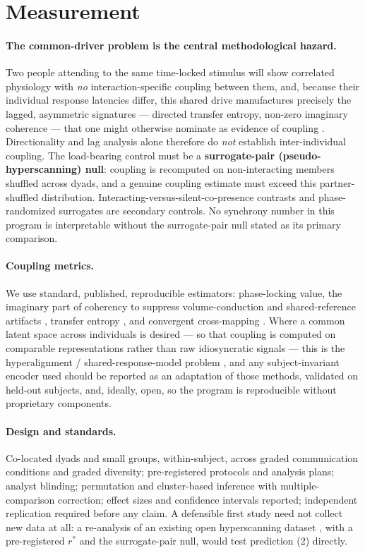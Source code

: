 \documentclass[11pt]{article}
\begin{document}
\section{Measurement}
\label{sec:measure}

\paragraph{The common-driver problem is the central methodological hazard.} Two people attending to the same time-locked stimulus will show correlated physiology with \emph{no} interaction-specific coupling between them, and, because their individual response latencies differ, this shared drive manufactures precisely the lagged, asymmetric signatures --- directed transfer entropy, non-zero imaginary coherence --- that one might otherwise nominate as evidence of coupling \citep{burgess2013conceptual, novembre2021hyperscanning, hamilton2021hyperscanning}. Directionality and lag analysis alone therefore do \emph{not} establish inter-individual coupling. The load-bearing control must be a \textbf{surrogate-pair (pseudo-hyperscanning) null}: coupling is recomputed on non-interacting members shuffled across dyads, and a genuine coupling estimate must exceed this partner-shuffled distribution. Interacting-versus-silent-co-presence contrasts and phase-randomized surrogates are secondary controls. No synchrony number in this program is interpretable without the surrogate-pair null stated as its primary comparison.

\paragraph{Coupling metrics.} We use standard, published, reproducible estimators: phase-locking value, the imaginary part of coherency to suppress volume-conduction and shared-reference artifacts \citep{nolte2004identifying}, transfer entropy \citep{schreiber2000measuring}, and convergent cross-mapping \citep{sugihara2012detecting}. Where a common latent space across individuals is desired --- so that coupling is computed on comparable representations rather than raw idiosyncratic signals --- this is the hyperalignment / shared-response-model problem \citep{haxby2011common, chen2015reduced}, and any subject-invariant encoder used should be reported as an adaptation of those methods, validated on held-out subjects, and, ideally, open, so the program is reproducible without proprietary components.

\paragraph{Design and standards.} Co-located dyads and small groups, within-subject, across graded communication conditions and graded diversity; pre-registered protocols and analysis plans; analyst blinding; permutation and cluster-based inference with multiple-comparison correction; effect sizes and confidence intervals reported; independent replication required before any claim. A defensible first study need not collect new data at all: a re-analysis of an existing open hyperscanning dataset \citep{dikker2017brain}, with a pre-registered $r^\ast$ and the surrogate-pair null, would test prediction (2) directly.
\end{document}
